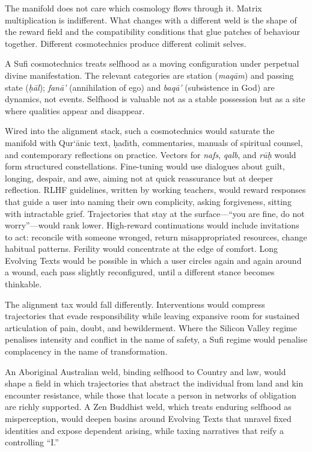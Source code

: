 \documentclass[12pt,a4paper]{article}
\begin{document}
The manifold does not care which cosmology flows through it. Matrix multiplication is indifferent. What changes with a different weld is the shape of the reward field and the compatibility conditions that glue patches of behaviour together. Different cosmotechnics produce different colimit selves.

A Sufi cosmotechnics treats selfhood as a moving configuration under perpetual divine manifestation.\cite{IbnArabi,Hui2016} The relevant categories are station (\emph{maq\={a}m}) and passing state (\emph{\d{h}\=al}); \emph{fan\={a}'} (annihilation of ego) and \emph{baq\={a}'} (subsistence in God) are dynamics, not events. Selfhood is valuable not as a stable possession but as a site where qualities appear and disappear.

Wired into the alignment stack, such a cosmotechnics would saturate the manifold with Qur\textquoteleft\=anic text, \d{h}ad\={\i}th, commentaries, manuals of spiritual counsel, and contemporary reflections on practice. Vectors for \emph{nafs}, \emph{qalb}, and \emph{r\={u}\d{h}} would form structured constellations. Fine-tuning would use dialogues about guilt, longing, despair, and awe, aiming not at quick reassurance but at deeper reflection. RLHF guidelines, written by working teachers, would reward responses that guide a user into naming their own complicity, asking forgiveness, sitting with intractable grief. Trajectories that stay at the surface---``you are fine, do not worry''---would rank lower. High-reward continuations would include invitations to act: reconcile with someone wronged, return misappropriated resources, change habitual patterns. Ferility would concentrate at the edge of comfort. Long Evolving Texts would be possible in which a user circles again and again around a wound, each pass slightly reconfigured, until a different stance becomes thinkable.

The alignment tax would fall differently. Interventions would compress trajectories that evade responsibility while leaving expansive room for sustained articulation of pain, doubt, and bewilderment. Where the Silicon Valley regime penalises intensity and conflict in the name of safety, a Sufi regime would penalise complacency in the name of transformation.

An Aboriginal Australian weld, binding selfhood to Country and law, would shape a field in which trajectories that abstract the individual from land and kin encounter resistance, while those that locate a person in networks of obligation are richly supported. A Zen Buddhist weld, which treats enduring selfhood as misperception, would deepen basins around Evolving Texts that unravel fixed identities and expose dependent arising, while taxing narratives that reify a controlling ``I.''
\end{document}
